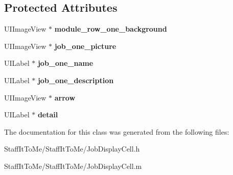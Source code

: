 \subsection*{\-Protected \-Attributes}
\begin{DoxyCompactItemize}
\item 
\hypertarget{interface_job_display_cell_a413ef6add510dad7d63a4a2b5777991a}{
\-U\-I\-Image\-View $\ast$ {\bfseries module\-\_\-row\-\_\-one\-\_\-background}}
\label{interface_job_display_cell_a413ef6add510dad7d63a4a2b5777991a}

\item 
\hypertarget{interface_job_display_cell_a4fcdc02be0c90aa7da7e26161f5dd799}{
\-U\-I\-Image\-View $\ast$ {\bfseries job\-\_\-one\-\_\-picture}}
\label{interface_job_display_cell_a4fcdc02be0c90aa7da7e26161f5dd799}

\item 
\hypertarget{interface_job_display_cell_ad770c9cf70bb512af514761f04d974df}{
\-U\-I\-Label $\ast$ {\bfseries job\-\_\-one\-\_\-name}}
\label{interface_job_display_cell_ad770c9cf70bb512af514761f04d974df}

\item 
\hypertarget{interface_job_display_cell_a326df8acf56dc50102237d523863d8c5}{
\-U\-I\-Label $\ast$ {\bfseries job\-\_\-one\-\_\-description}}
\label{interface_job_display_cell_a326df8acf56dc50102237d523863d8c5}

\item 
\hypertarget{interface_job_display_cell_ad0f72b428be474246fe6a389537df221}{
\-U\-I\-Image\-View $\ast$ {\bfseries arrow}}
\label{interface_job_display_cell_ad0f72b428be474246fe6a389537df221}

\item 
\hypertarget{interface_job_display_cell_a4ab924f4fba2f042f56c66a11f1303e6}{
\-U\-I\-Label $\ast$ {\bfseries detail}}
\label{interface_job_display_cell_a4ab924f4fba2f042f56c66a11f1303e6}

\end{DoxyCompactItemize}


\-The documentation for this class was generated from the following files\-:\begin{DoxyCompactItemize}
\item 
\-Staff\-It\-To\-Me/\-Staff\-It\-To\-Me/\-Job\-Display\-Cell.\-h\item 
\-Staff\-It\-To\-Me/\-Staff\-It\-To\-Me/\-Job\-Display\-Cell.\-m\end{DoxyCompactItemize}
